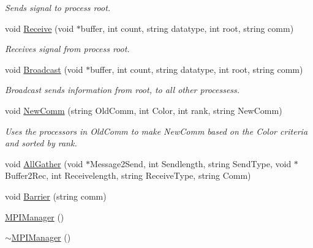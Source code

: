 \begin{DoxyCompactItemize}
\begin{DoxyCompactList}\small\item\em Sends signal to process root. \item\end{DoxyCompactList}\item 
void \hyperlink{classJKBuilder_1_1MPIManager_ab1442bcae2404867a58c12e3d1cc2b15}{Receive} (void $\ast$buffer, int count, string datatype, int root, string comm)
\begin{DoxyCompactList}\small\item\em Receives signal from process root. \item\end{DoxyCompactList}\item 
void \hyperlink{classJKBuilder_1_1MPIManager_ae7fbfac94b9a7fff2f378fb34b550957}{Broadcast} (void $\ast$buffer, int count, string datatype, int root, string comm)
\begin{DoxyCompactList}\small\item\em Broadcast sends information from root, to all other processess. \item\end{DoxyCompactList}\item 
void \hyperlink{classJKBuilder_1_1MPIManager_a9b48de66ac7a99bc490fe3d4d940ca47}{NewComm} (string OldComm, int Color, int rank, string NewComm)
\begin{DoxyCompactList}\small\item\em Uses the processors in OldComm to make NewComm based on the Color criteria and sorted by rank. \item\end{DoxyCompactList}\item 
void \hyperlink{classJKBuilder_1_1MPIManager_a361624cbb5157081a71a2d1038fec676}{AllGather} (void $\ast$Message2Send, int Sendlength, string SendType, void $\ast$Buffer2Rec, int Receivelength, string ReceiveType, string Comm)
\item 
void \hyperlink{classJKBuilder_1_1MPIManager_a5c9f3bb8eb11f62048166357ea651f44}{Barrier} (string comm)
\item 
\hyperlink{classJKBuilder_1_1MPIManager_ac5bf36d4313f974db1d1d21362d97d04}{MPIManager} ()
\item 
\hyperlink{classJKBuilder_1_1MPIManager_a8bb26f25399bff1611d0c7db989333d0}{$\sim$MPIManager} ()
\end{DoxyCompactItemize}
